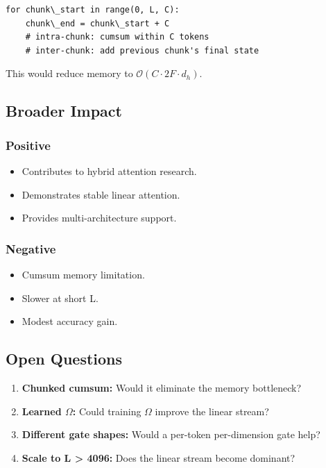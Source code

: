 \begin{lstlisting}
for chunk\_start in range(0, L, C):
    chunk\_end = chunk\_start + C
    # intra-chunk: cumsum within C tokens
    # inter-chunk: add previous chunk's final state
\end{lstlisting}

This would reduce memory to $\mathcal{O}(C \cdot 2F \cdot d_h)$.

\subsection{Broader Impact}

\subsubsection{Positive}
\begin{itemize}
\item Contributes to hybrid attention research.
\item Demonstrates stable linear attention.
\item Provides multi-architecture support.

\end{itemize}
\subsubsection{Negative}
\begin{itemize}
\item Cumsum memory limitation.
\item Slower at short L.
\item Modest accuracy gain.

\end{itemize}
\subsection{Open Questions}

\begin{enumerate}
\item \textbf{Chunked cumsum:} Would it eliminate the memory bottleneck?
\item \textbf{Learned $\Omega$:} Could training $\Omega$ improve the linear stream?
\item \textbf{Different gate shapes:} Would a per-token per-dimension gate help?
\item \textbf{Scale to L \textgreater{} 4096:} Does the linear stream become dominant?

\end{enumerate}



